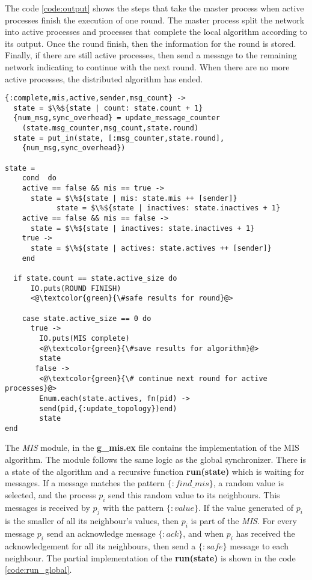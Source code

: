 The code \ref{code:output} shows the steps that take the master process when active processes finish the execution of one round. The master process split the network into active processes and processes that complete the local algorithm according to its output.  Once the round finish, then the information for the round is stored. Finally, if there are still active processes, then send a message to the remaining network indicating to continue with the next round. When there are no more active processes, the distributed algorithm has ended.    
 
 
\begin{lstlisting}[frame=single, columns=fullflexible, mathescape=true, caption= Output of processes per round  , label = code:output]
{:complete,mis,active,sender,msg_count} ->
  state = $\%${state | count: state.count + 1}
  {num_msg,sync_overhead} = update_message_counter
    (state.msg_counter,msg_count,state.round)
  state = put_in(state, [:msg_counter,state.round],
    {num_msg,sync_overhead})

state =
    cond  do
    active == false && mis == true ->  
      state = $\%${state | mis: state.mis ++ [sender]}
            state = $\%${state | inactives: state.inactives + 1}
    active == false && mis == false ->
      state = $\%${state | inactives: state.inactives + 1}
    true ->  
      state = $\%${state | actives: state.actives ++ [sender]}
    end

  if state.count == state.active_size do
      IO.puts(ROUND FINISH)
      <@\textcolor{green}{\#safe results for round}@> 
    
    case state.active_size == 0 do
      true ->
        IO.puts(MIS complete)
        <@\textcolor{green}{\#save results for algorithm}@> 
        state
       false ->
        <@\textcolor{green}{\# continue next round for active processes}@> 
        Enum.each(state.actives, fn(pid) ->
        send(pid,{:update_topology})end)
        state
end
\end{lstlisting}



The \textit{MIS} module, in the \textbf{g\_mis.ex} file contains the implementation of the MIS algorithm. The module follows the same logic as the global synchronizer. There is a state of the algorithm and a recursive function \textbf{run(state)} which is waiting for messages. If a message matches the pattern $\{:find\_mis\}$, a random value is selected, and the process $p_i$ send this random value to its neighbours. This messages is received by $p_j$ with the pattern $\{:value\}$. If the value generated of $p_i$ is the smaller of all its neighbour's values, then $p_i$ is part of the \textit{MIS}. For every message $p_i$ send an acknowledge message $\{:ack\}$, and when $p_i$ has received the acknowledgement for all its neighbours, then send a $\{:safe\}$ message to each neighbour. The partial implementation of the \textbf{run(state)} is shown in the code \ref{code:run_global}.

